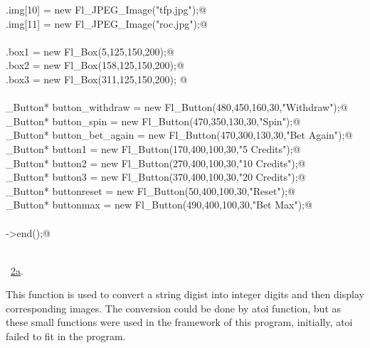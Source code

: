 \documentclass{article}
\renewcommand{\NWlink}[2]{\hyperlink{#1}{#2}}
\begin{document}
\begin{flushleft}
\begin{minipage}{\linewidth}
\begin{list}{}{}
\mbox{}\verb@widgets.img[10] = new Fl_JPEG_Image("tfp.jpg");@\\
\mbox{}\verb@widgets.img[11] = new Fl_JPEG_Image("roc.jpg");@\\
\mbox{}\verb@@\\
\mbox{}\verb@widgets.box1 = new Fl_Box(5,125,150,200);@\\
\mbox{}\verb@widgets.box2 = new Fl_Box(158,125,150,200);@\\
\mbox{}\verb@widgets.box3 = new Fl_Box(311,125,150,200); @\\
\mbox{}\verb@@\\
\mbox{}\verb@Fl_Button* button_withdraw = new Fl_Button(480,450,160,30,"Withdraw");@\\
\mbox{}\verb@Fl_Button* button_spin = new Fl_Button(470,350,130,30,"Spin");@\\
\mbox{}\verb@Fl_Button* button_bet_again = new Fl_Button(470,300,130,30,"Bet Again");@\\
\mbox{}\verb@Fl_Button* button1 = new Fl_Button(170,400,100,30,"5 Credits");@\\
\mbox{}\verb@Fl_Button* button2 = new Fl_Button(270,400,100,30,"10 Credits");@\\
\mbox{}\verb@Fl_Button* button3 = new Fl_Button(370,400,100,30,"20 Credits");@\\
\mbox{}\verb@Fl_Button* buttonreset = new Fl_Button(50,400,100,30,"Reset");@\\
\mbox{}\verb@Fl_Button* buttonmax = new Fl_Button(490,400,100,30,"Bet Max");@\\
\mbox{}\verb@@\\
\mbox{}\verb@w->end();@\\
\mbox{}\verb@@\\
\mbox{}\verb@@{\NWsep}
\end{list}
\vspace{-1.5ex}
\footnotesize
\begin{list}{}{\setlength{\itemsep}{-\parsep}\setlength{\itemindent}{-\leftmargin}}
\item \NWtxtMacroRefIn\ \NWlink{nuweb2a}{2a}.

\item{}
\end{list}
\end{minipage}\vspace{4ex}
\end{flushleft}
This function is used to convert a string digist into integer digits and then display corresponding images. The conversion could be done by atoi function, but as these small functions were used in the framework of this program, initially, atoi failed to fit in the program.
\end{document}
